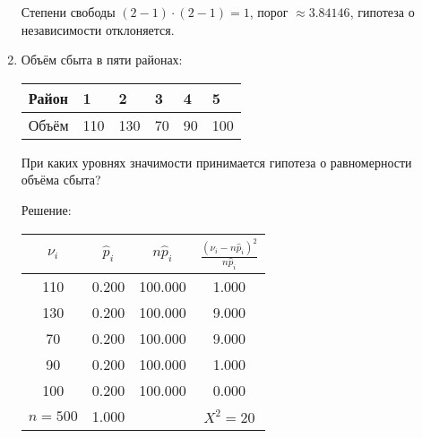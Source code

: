 \documentclass[a4paper,12pt]{article}
\begin{document}
\begin{enumerate}
                  Степени свободы $(2-1) \cdot (2-1) = 1$, порог $\approx 3.84146$, гипотеза о независимости отклоняется.

      \item \cite[285]{Efimov} Объём сбыта в пяти районах:

            \begin{center}
                  \begin{tabular}{|P{1.5cm}|P{1cm}|P{1cm}|P{1cm}|P{1cm}|P{1cm}|}
                        \hline
                        Район & 1   & 2   & 3  & 4  & 5   \\
                        \hline
                        Объём & 110 & 130 & 70 & 90 & 100 \\
                        \hline
                  \end{tabular}
            \end{center}

            При каких уровнях значимости принимается гипотеза о равномерности объёма сбыта?

            Решение: \par
                  \begin{tabular}{|c|c|c|c|}
                        \hline
                        $\nu_i$   & $\widehat{p}_i$ & $n \widehat{p}_i$ & $\frac{(\nu_i - n \widehat{p}_i)^2}{n \widehat{p}_i}$ \\
                        \hline
                        110       & 0.200           & 100.000           & 1.000                                                 \\
                        130       & 0.200           & 100.000           & 9.000                                                 \\
                        70        & 0.200           & 100.000           & 9.000                                                 \\
                        90        & 0.200           & 100.000           & 1.000                                                 \\
                        100       & 0.200           & 100.000           & 0.000                                                 \\
                        \hline
                        $n = 500$ & 1.000           &                   & $X^2 = 20$                                            \\
                        \hline
                  \end{tabular}


\end{enumerate}
\end{document}
